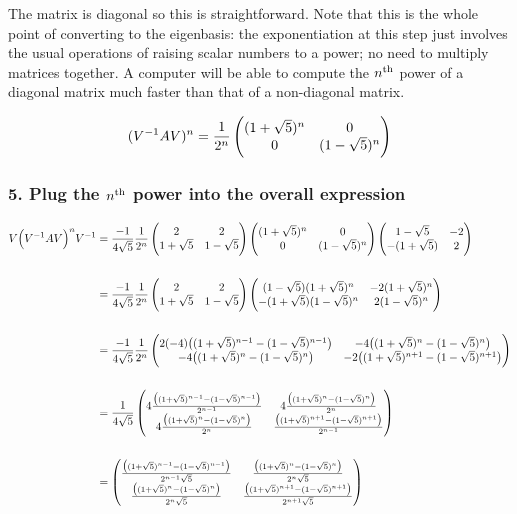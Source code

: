 The matrix is diagonal so this is straightforward. Note that this is the whole
point of converting to the eigenbasis: the exponentiation at this step just
involves the usual operations of raising scalar numbers to a power; no need to
multiply matrices together. A computer will be able to compute the $n^{\text{th}}$ power
of a diagonal matrix much faster than that of a non-diagonal matrix.

$$
(V^{-1}AV)^n = \frac{1}{2^n} \begin{pmatrix}(1 + \sqrt 5)^n & 0          \\0               & (1 - \sqrt 5)^n\\ \end{pmatrix}
$$

\subsubsection{5. Plug the $n^{\text{th}}$ power into the overall expression}

\begin{align*}
V \Big(V^{-1}AV\Big)^n V^{-1}
&=
\frac{-1}{4\sqrt 5}
\frac{1}{2^n}
\begin{pmatrix}2           & 2          \\1 + \sqrt 5 & 1 - \sqrt 5\\ \end{pmatrix}
\begin{pmatrix}(1 + \sqrt 5)^n & 0              \\0               & (1 - \sqrt 5)^n\\ \end{pmatrix}
\begin{pmatrix}1 - \sqrt 5  & -2\\-(1 + \sqrt 5) & 2\\ \end{pmatrix}
\\\\
&=
\frac{-1}{4\sqrt 5}
\frac{1}{2^n}
\begin{pmatrix}2           & 2          \\1 + \sqrt 5 & 1 - \sqrt 5\\ \end{pmatrix}
\begin{pmatrix}(1 - \sqrt 5)(1 + \sqrt 5)^n & -2(1 + \sqrt 5)^n\\-(1 + \sqrt 5)(1 - \sqrt 5)^n & 2(1 - \sqrt 5)^n\\ \end{pmatrix}
\\\\
&=
\frac{-1}{4\sqrt 5}
\frac{1}{2^n}
\begin{pmatrix}2(-4)\big((1 + \sqrt 5)^{n-1} - (1 - \sqrt 5)^{n-1}\big) & -4\big((1 + \sqrt 5)^n     - (1 - \sqrt 5)^n    \big)\\   -4\big((1 + \sqrt 5)^n     - (1 - \sqrt 5)^n    \big) & -2\big((1 + \sqrt 5)^{n+1} - (1 - \sqrt 5)^{n+1}\big)\\ \end{pmatrix}
\\\\
&=
\frac{1}{4\sqrt 5}
\begin{pmatrix}4\frac{\big((1 + \sqrt 5)^{n-1} - (1 - \sqrt 5)^{n-1}\big)}{2^{n-1}} & 4\frac{\big((1 + \sqrt 5)^n     - (1 - \sqrt 5)^n    \big)}{2^n    }\\4\frac{\big((1 + \sqrt 5)^n     - (1 - \sqrt 5)^n    \big)}{2^n    } &  \frac{\big((1 + \sqrt 5)^{n+1} - (1 - \sqrt 5)^{n+1}\big)}{2^{n-1}}\\ \end{pmatrix}
\\\\
&=
\begin{pmatrix}\frac{\big((1 + \sqrt 5)^{n-1} - (1 - \sqrt 5)^{n-1}\big)}{2^{n-1}\sqrt 5} & \frac{\big((1 + \sqrt 5)^n     - (1 - \sqrt 5)^n    \big)}{2^n    \sqrt 5}\\\frac{\big((1 + \sqrt 5)^n     - (1 - \sqrt 5)^n    \big)}{2^n    \sqrt 5} & \frac{\big((1 + \sqrt 5)^{n+1} - (1 - \sqrt 5)^{n+1}\big)}{2^{n+1}\sqrt 5}\\ \end{pmatrix}
\end{align*}

